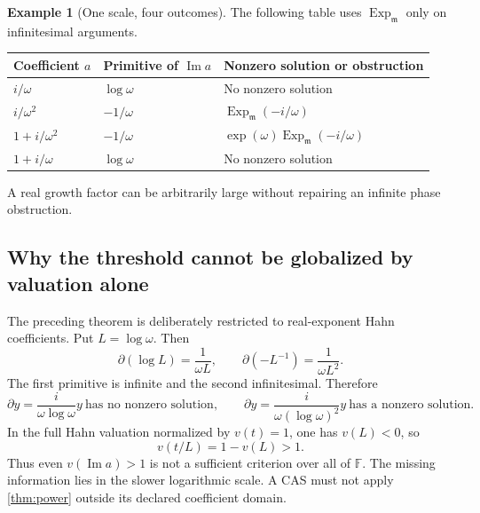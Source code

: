 \documentclass[11pt,a4paper]{article}
\numberwithin{equation}{section}
\theoremstyle{definition}
\newtheorem{example}[theorem]{Example}
\theoremstyle{remark}
\newcommand{\F}{\mathbb F}
\newcommand{\mm}{\mathfrak m}
\newcommand{\D}{\partial}
\newcommand{\Ex}{\operatorname{Exp}_{\mm}}
\newcommand{\Imm}{\operatorname{Im}}
\begin{document}
\begin{example}[One scale, four outcomes]
The following table uses $\Ex$ only on infinitesimal arguments.
\begin{center}\small
\begin{tabularx}{\textwidth}{@{}P{0.25\textwidth}P{0.24\textwidth}Y@{}}
\toprule
Coefficient $a$ & Primitive of $\Imm a$ & Nonzero solution or obstruction\\
\midrule
$i/\omega$ & $\log\omega$ & No nonzero solution\\[0.3em]
$i/\omega^2$ & $-1/\omega$ & $\Ex(-i/\omega)$\\[0.3em]
$1+i/\omega^2$ & $-1/\omega$ & $\exp(\omega)\Ex(-i/\omega)$\\[0.3em]
$1+i/\omega$ & $\log\omega$ & No nonzero solution\\
\bottomrule
\end{tabularx}
\end{center}
A real growth factor can be arbitrarily large without repairing an infinite
phase obstruction.
\end{example}

\subsection{Why the threshold cannot be globalized by valuation alone}
The preceding theorem is deliberately restricted to real-exponent Hahn
coefficients. Put $L=\log\omega$. Then
\[
 \D(\log L)=\frac{1}{\omega L},\qquad
 \D(-L^{-1})=\frac{1}{\omega L^2}.
\]
The first primitive is infinite and the second infinitesimal. Therefore
\begin{equation}\label{eq:log-separator}
 \D y=\frac{i}{\omega\log\omega}y
 \ \text{has no nonzero solution},\qquad
 \D y=\frac{i}{\omega(\log\omega)^2}y
 \ \text{has a nonzero solution}.
\end{equation}
In the full Hahn valuation normalized by $v(t)=1$, one has $v(L)<0$, so
\[
 v(t/L)=1-v(L)>1.
\]
Thus even $v(\Imm a)>1$ is not a sufficient criterion over all of $\F$.
The missing information lies in the slower logarithmic scale. A CAS must
not apply \cref{thm:power} outside its declared coefficient domain.
\end{document}
